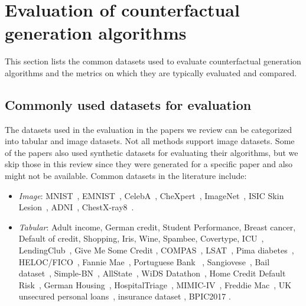 \section{Evaluation of counterfactual generation algorithms}
\label{sec:eval}
This section lists the common datasets used to evaluate counterfactual generation algorithms and the metrics on which they are typically evaluated and compared. 

\subsection{Commonly used datasets for evaluation}
The datasets used in the evaluation in the papers we review can be categorized into tabular and image datasets. Not all methods support image datasets. 
Some of the papers also used synthetic datasets for evaluating their algorithms, but we skip those in this review since they were generated for a specific paper and also might not be available. 
Common datasets in the literature include:
\begin{itemize}[leftmargin=*]
    \item \emph{Image}: MNIST~\citep{lecun-mnisthandwrittendigit-2010}, EMNIST~\citep{EMNIST-data}, CelebA~\citep{celebA_data}, CheXpert~\citep{chexpert-data}, ImageNet~\citep{imagenet-data}, ISIC Skin Lesion~\citep{isic-skin-data}, ADNI~\citep{alzheimer-data}, ChestX-ray8~\citep{chest-xray-data}.
    
    \item \emph{Tabular}: Adult income, German credit, Student Performance, Breast cancer, Default of credit, Shopping, Iris,  Wine, Spambee, Covertype, ICU~\citep{UCI-repo}, LendingClub~\citep{lendingclub-data}, Give Me Some Credit \citep{givemesomecredit-data}, COMPAS~\citep{compas-data}, LSAT~\citep{lsat-data}, Pima diabetes~\citep{pima-diabetes-data}, HELOC/FICO~\citep{fico-data}, Fannie Mae~\citep{fannie-data}, Portuguese Bank~ \citep{Portuguese_Bank_data}, Sangiovese~\citep{Sangiovese-data}, Bail dataset~\citep{bail-data}, 
    Simple-BN~\citep{mahajan_preserving_2020}, AllState~\citep{allstate-data}, WiDS Datathon~\citep{woman-in-cs-data}, Home Credit Default Risk~\citep{home-credit-data}, German Housing~\citep{forster-capturing-2021}, HospitalTriage~\citep{hospitaltriage-data}, MIMIC-IV~\citep{MMIC-IV}, Freddie Mac~\citep{freddiemac-data}, UK unsecured personal loans~\citep{stress-test-creditscore}, insurance dataset \citep{inverse-classification-multiple-algos}, BPIC2017 \citep{Loreley-huang-2022}. 
\end{itemize}

